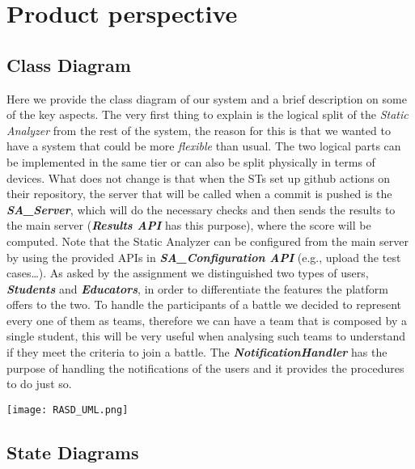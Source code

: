 \section{Product perspective}
\label{s:Product_perspective}%

\subsection{Class Diagram}
\label{ss:class_diagram}%
Here we provide the class diagram of our system and a brief description on some of the key aspects. The very first thing to explain is the logical split of the \textit{Static Analyzer} from the rest of the system, the reason for this is that we wanted to have a system that could be more \textit{flexible} than usual. The two logical parts can be implemented in the same tier or can also be split physically in terms of devices. What does not change is that when the STs set up github actions on their repository, the server that will be called when a commit is pushed is the \textbf{\textit{SA\_Server}}, which will do the necessary checks and then sends the results to the main server (\textbf{\textit{Results API}} has this purpose), where the score will be computed. Note that the Static Analyzer can be configured from the main server by using the provided APIs in \textbf{\textit{SA\_Configuration API}} (e.g., upload the test cases…). 
As asked by the assignment we distinguished two types of users, \textbf{\textit{Students}} and \textbf{\textit{Educators}}, in order to differentiate the features the platform offers to the two. To handle the participants of a battle we decided to represent every one of them as teams, therefore we can have a team that is composed by a single student, this will be very useful when analysing such teams to understand if they meet the criteria to join a battle. The \textbf{\textit{NotificationHandler}} has the purpose of handling the notifications of the users and it provides the procedures to do just so.


\begin{center}
  \texttt{[image: RASD\_UML.png]}
\end{center}

\subsection{State Diagrams}
\label{ss:state_diagrams}%

